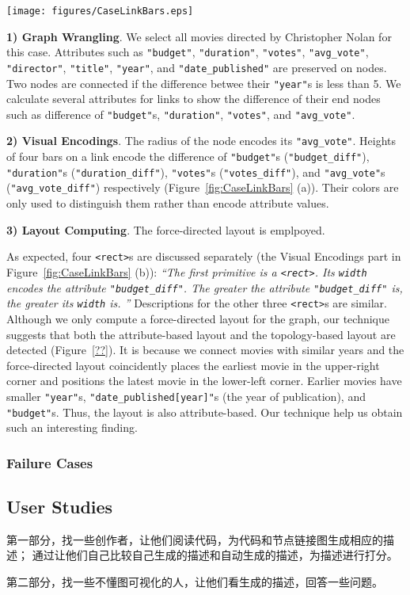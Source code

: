 \begin{figure*}[ht]
    \centering
    \texttt{[image: figures/CaseLinkBars.eps]}
    \caption{xxx}
    \label{fig:CaseLinkBars}
\end{figure*}

\textbf{1) Graph Wrangling}.
We select all movies directed by Christopher Nolan for this case.
Attributes such as \texttt{"budget"}, \texttt{"duration"}, \texttt{"votes"}, \texttt{"avg\_vote"}, \texttt{"director"}, \texttt{"title"}, \texttt{"year"}, and \texttt{"date\_published"} are preserved on nodes.
Two nodes are connected if the difference betwee their \texttt{"year"}s is less than 5.
We calculate several attributes for links to show the difference of their end nodes such as difference of \texttt{"budget"}s, \texttt{"duration"}, \texttt{"votes"}, and \texttt{"avg\_vote"}.

\textbf{2) Visual Encodings}.
The radius of the node encodes its \texttt{"avg\_vote"}.
Heights of four bars on a link encode the difference of \texttt{"budget"}s (\texttt{"budget\_diff"}), \texttt{"duration"}s (\texttt{"duration\_diff"}), \texttt{"votes"}s (\texttt{"votes\_diff"}), and \texttt{"avg\_vote"}s (\texttt{"avg\_vote\_diff"}) respectively (Figure~\ref{fig:CaseLinkBars} (a)).
Their colors are only used to distinguish them rather than encode attribute values.

\textbf{3) Layout Computing}.
The force-directed layout is emplpoyed.

As expected, four \texttt{<rect>}s are discussed separately (the Visual Encodings part in Figure~\ref{fig:CaseLinkBars} (b)):
\textit{``The first primitive is a \texttt{<rect>}. Its \texttt{width} encodes the attribute \texttt{"budget\_diff"}. The greater the attribute \texttt{"budget\_diff"} is, the greater its \texttt{width} is.
''}
Descriptions for the other three \texttt{<rect>}s are similar.
Although we only compute a force-directed layout for the graph, our technique suggests that both the attribute-based layout and the topology-based layout are detected (Figure~\ref{??}).
It is because we connect movies with similar years and the force-directed layout coincidently places the earliest movie in the upper-right corner and positions the latest movie in the lower-left corner.
Earlier movies have smaller \texttt{"year"}s, \texttt{"date\_published[year]"}s (the year of publication), and \texttt{"budget"}s.
Thus, the layout is also attribute-based.
Our technique help us obtain such an interesting finding.

\subsubsection{Failure Cases}

\subsection{User Studies}
第一部分，找一些创作者，让他们阅读代码，为代码和节点链接图生成相应的描述；
通过让他们自己比较自己生成的描述和自动生成的描述，为描述进行打分。

第二部分，找一些不懂图可视化的人，让他们看生成的描述，回答一些问题。